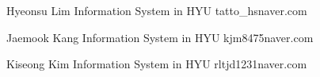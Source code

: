 \documentclass[14pt]{article}
\begin{document}
Hyeonsu Lim
Information System in HYU
tatto_hs\@ naver.com

Jaemook Kang
Information System in HYU 
kjm8475\@ naver.com

Kiseong Kim
Information System in HYU
rltjd1231\@ naver.com 
\end{document}
